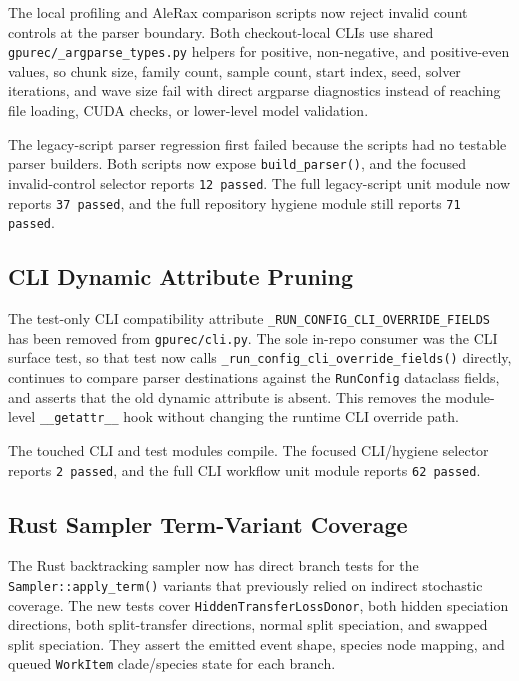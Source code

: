 \documentclass[11pt]{article}
\begin{document}
The local profiling and AleRax comparison scripts now reject invalid count
controls at the parser boundary.  Both checkout-local CLIs use shared
\texttt{gpurec/\_argparse\_types.py} helpers for positive, non-negative, and
positive-even values, so chunk size, family count, sample count, start index,
seed, solver iterations, and wave size fail with direct argparse diagnostics
instead of reaching file loading, CUDA checks, or lower-level model validation.

The legacy-script parser regression first failed because the scripts had no
testable parser builders.  Both scripts now expose \texttt{build\_parser()},
and the focused invalid-control selector reports \texttt{12 passed}.  The full
legacy-script unit module now reports \texttt{37 passed}, and the full
repository hygiene module still reports \texttt{71 passed}.

\subsection{CLI Dynamic Attribute Pruning}

The test-only CLI compatibility attribute
\texttt{\_RUN\_CONFIG\_CLI\_OVERRIDE\_FIELDS} has been removed from
\texttt{gpurec/cli.py}.  The sole in-repo consumer was the CLI surface test, so
that test now calls \texttt{\_run\_config\_cli\_override\_fields()} directly,
continues to compare parser destinations against the \texttt{RunConfig}
dataclass fields, and asserts that the old dynamic attribute is absent.  This
removes the module-level \texttt{\_\_getattr\_\_} hook without changing the
runtime CLI override path.

The touched CLI and test modules compile.  The focused CLI/hygiene selector
reports \texttt{2 passed}, and the full CLI workflow unit module reports
\texttt{62 passed}.

\subsection{Rust Sampler Term-Variant Coverage}

The Rust backtracking sampler now has direct branch tests for the
\texttt{Sampler::apply\_term()} variants that previously relied on indirect
stochastic coverage.  The new tests cover
\texttt{HiddenTransferLossDonor}, both hidden speciation directions, both
split-transfer directions, normal split speciation, and swapped split
speciation.  They assert the emitted event shape, species node mapping, and
queued \texttt{WorkItem} clade/species state for each branch.
\end{document}
